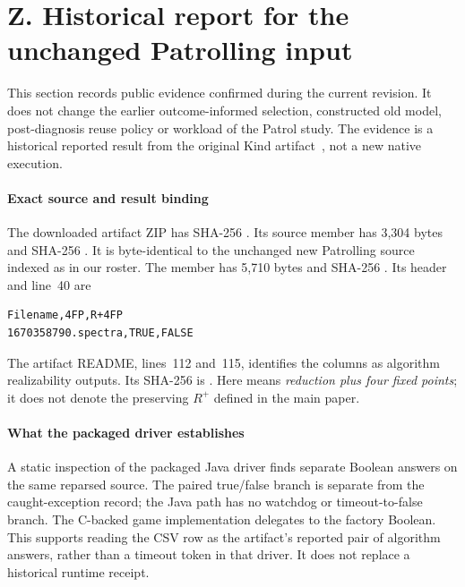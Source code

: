 \clearpage
\section*{Z. Historical report for the unchanged Patrolling input}
This section records public evidence confirmed during the current revision.
It does not change the earlier outcome-informed selection, constructed
old model, post-diagnosis reuse policy or workload of the Patrol study.
The evidence is a historical reported result from the original Kind
artifact~\cite{kindartifact}, not a new native execution.

\paragraph{Exact source and result binding}
The downloaded artifact ZIP has SHA-256
.
Its source member
has 3,304 bytes and SHA-256
.
It is byte-identical to the unchanged new Patrolling source indexed as
 in our roster.
The member
has 5,710 bytes and SHA-256
.
Its header and line~40 are
\begin{verbatim}
Filename,4FP,R+4FP
1670358790.spectra,TRUE,FALSE
\end{verbatim}
The artifact README, lines~112 and~115, identifies the columns as
algorithm realizability outputs. Its SHA-256 is
.
Here  means \emph{reduction plus four fixed points}; it does
not denote the preserving $R^+$ defined in the main paper.

\paragraph{What the packaged driver establishes}
A static inspection of the packaged Java driver finds separate
 Boolean answers on the same reparsed source.
The paired true/false branch is separate from the caught-exception
record; the Java path has no watchdog or timeout-to-false branch.
The C-backed game implementation delegates to the factory Boolean.
This supports reading the CSV row as the artifact's reported pair of
algorithm answers, rather than a timeout token in that driver.
It does not replace a historical runtime receipt.

